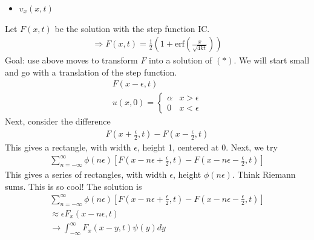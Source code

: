 \documentclass[12pt, letterpaper]{article}
\begin{document}
\begin{enumerate}
\begin{itemize}
        \item $v_x(x,t)$
    \end{itemize}
    Let $F(x,t)$ be the solution with the step function IC.
    \begin{align*}
        \Rightarrow F(x,t) = \frac 12 (1 + \text{erf}(\frac{x}{\sqrt{4kt}}))
    \end{align*}
    Goal: use above moves to transform $F$ into a solution of $(\ast)$. We will start small and 
    go with a translation of the step function.
    \begin{align*}
        F(x - \epsilon, t) \\
        u(x,0) = \begin{cases}
            \alpha & x > \epsilon \\
            0 & x < \epsilon
        \end{cases}
    \end{align*}
    Next, consider the difference
    \begin{align*}
        F(x + \frac{\epsilon}{2},t) - F(x - \frac \epsilon 2, t)
    \end{align*}
    This gives a rectangle, with width $\epsilon$, height 1, centered at 0. Next, we try
    \begin{align*}
        \sum_{n = - \infty}^{\infty} \phi(n\epsilon) \left[F(x-n\epsilon + \frac{\epsilon}{2},t) - F(x-n\epsilon - \frac{\epsilon}{2},t)\right]
    \end{align*}
    This gives a series of rectangles, with width $\epsilon$, height $\phi(n\epsilon)$. 
    Think Riemann sums. This is so cool! The solution is 
    \begin{align*}
        \sum_{n = - \infty}^{\infty} \phi(n\epsilon) \left[F(x-n\epsilon + \frac{\epsilon}{2},t) - F(x-n\epsilon - \frac{\epsilon}{2},t)\right] \\
        \approx \epsilon F_x(x-n\epsilon, t) \\
        \rightarrow \int_{-\infty}^{\infty} F_x ( x-y,t) \psi(y)dy
    \end{align*}
\end{enumerate}
\end{document}

